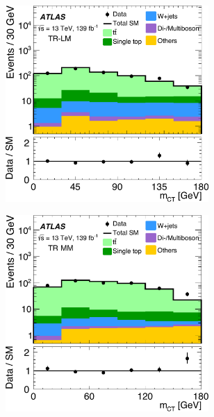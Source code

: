  \begin{figure}
	\centering
	\begin{subfigure}[b]{0.5\linewidth}
		\centering\includegraphics[width=0.85\textwidth]{OneLeptonbb_CR_TRLMEM_mct2_yellow}
	\end{subfigure}\hfill
	\begin{subfigure}[b]{0.5\linewidth}
		\centering\includegraphics[width=0.85\textwidth]{OneLeptonbb_CR_TRMMEM_mct2_yellow}
	\end{subfigure}\hfill
	\par\medskip

\end{figure}

